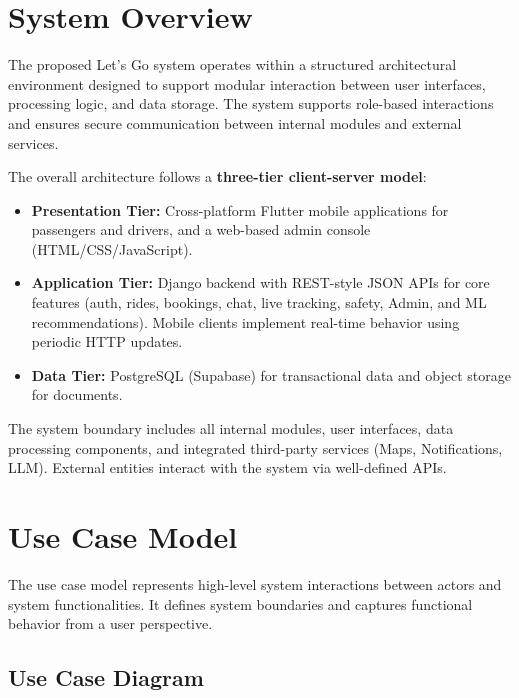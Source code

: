 \section{System Overview}

The proposed Let's Go system operates within a structured architectural environment designed to support modular interaction between user interfaces, processing logic, and data storage. The system supports role-based interactions and ensures secure communication between internal modules and external services.

The overall architecture follows a \textbf{three-tier client-server model}:
\begin{itemize}
    \item \textbf{Presentation Tier:} Cross-platform Flutter mobile applications for passengers and drivers, and a web-based admin console (HTML/CSS/JavaScript).
    \item \textbf{Application Tier:} Django backend with REST-style JSON APIs for core features (auth, rides, bookings, chat, live tracking, safety, Admin, and ML recommendations). Mobile clients implement real-time behavior using periodic HTTP updates.
    \item \textbf{Data Tier:} PostgreSQL (Supabase) for transactional data and object storage for documents.
\end{itemize}

The system boundary includes all internal modules, user interfaces, data processing components, and integrated third-party services (Maps, Notifications, LLM). External entities interact with the system via well-defined APIs.

\section{Use Case Model}

The use case model represents high-level system interactions between actors and system functionalities. It defines system boundaries and captures functional behavior from a user perspective.

\subsection{Use Case Diagram}

